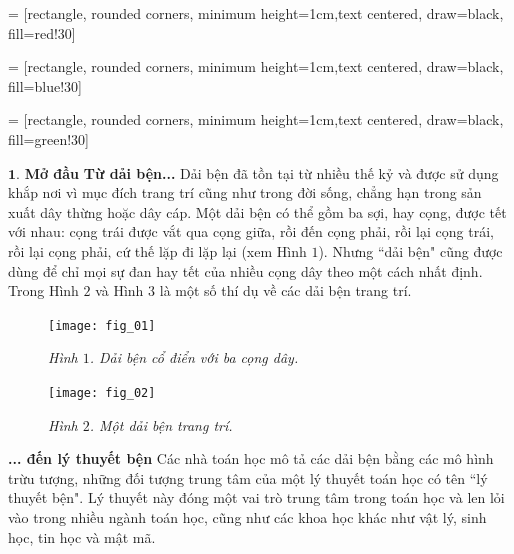 \vspace*{150pt}

 = [rectangle, rounded corners, minimum height=1cm,text centered, draw=black, fill=red!30]

 = [rectangle, rounded corners, minimum height=1cm,text centered, draw=black, fill=blue!30]

 = [rectangle, rounded corners, minimum height=1cm,text centered, draw=black, fill=green!30]

\begin{multicols}{2}	
	$\pmb{1.}$ \textbf{\color{duongvaotoanhoc}Mở đầu}
	\vskip 0.1cm
	\textbf{\color{duongvaotoanhoc}Từ dải bện...}
	\vskip 0.1cm
	Dải bện đã tồn tại từ nhiều thế kỷ và được sử dụng khắp nơi vì mục đích trang trí cũng như trong đời sống, chẳng hạn trong sản xuất dây thừng hoặc dây cáp. Một dải bện có thể gồm ba sợi, hay cọng, được tết với nhau: cọng trái được vắt qua cọng giữa, rồi đến cọng phải, rồi lại cọng trái, rồi lại cọng phải, cứ thế lặp đi lặp lại (xem Hình $1$). Nhưng ``dải bện" cũng được dùng để chỉ mọi sự đan hay tết của nhiều cọng dây theo một cách nhất định. Trong Hình $2$ và Hình $3$ là một số thí dụ về các dải bện trang trí.
	\begin{figure}[H]
		\vspace*{-5pt}
		\centering
		\captionsetup{labelformat= empty, justification=centering}
		\texttt{[image: fig\_01]}
		\caption{\small\textit{\color{duongvaotoanhoc}Hình $1$. Dải bện cổ điển với ba cọng dây.}}
		\vspace*{-10pt}
	\end{figure}
	\begin{figure}[H]
		\vspace*{-5pt}
		\centering
		\captionsetup{labelformat= empty, justification=centering}
		\texttt{[image: fig\_02]}
		\caption{\small\textit{\color{duongvaotoanhoc}Hình $2$. Một dải bện trang trí.}}
		\vspace*{-10pt}
	\end{figure}
	\textbf{\color{duongvaotoanhoc}... đến lý thuyết bện}
	\vskip 0.1cm
	Các nhà toán học mô tả các dải bện bằng các mô hình trừu tượng, những đối tượng trung tâm của một lý thuyết toán học có tên ``lý thuyết bện". Lý thuyết này đóng một vai trò trung tâm trong toán học và len lỏi vào trong nhiều ngành toán học, cũng như các khoa học khác như vật lý, sinh học, tin học và mật mã.
	\begin{figure}[H]
		\vspace*{-5pt}
		\centering
		\captionsetup{labelformat= empty, justification=centering}

\end{figure}
\end{multicols}
